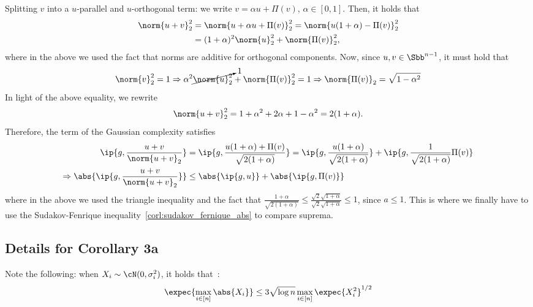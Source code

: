 \documentclass[a4paper]{article}
\begin{document}
Splitting $v$ into a $u$-parallel and $u$-orthogonal term: we write
$v = \alpha u + \Pi(v)$, $\alpha \in [0, 1]$. Then, it holds that
\begin{align*}
    \norm{u + v}_2^2 &= \norm{u + \alpha u + \Pi(v)}_2^2 =
        \norm{u(1 + \alpha) - \Pi(v)}_2^2 \\
        &= (1 + \alpha)^2 \norm{u}_2^2 + \norm{\Pi(v)}^2_2,
\end{align*}
where in the above we used the fact that norms are additive for orthogonal
components. Now, since $u, v \in \Sbb^{n-1}$, it must hold that
\[
    \norm{v}_2^2 = 1 \Rightarrow \alpha^2 \cancelto{1}{\norm{u}_2^2}
    + \norm{\Pi(v)}_2^2 = 1 \Rightarrow
    \norm{\Pi(v)}_2 = \sqrt{1 - \alpha^2}
\]
In light of the above equality, we rewrite
\[
    \norm{u + v}_2^2 = 1 + \alpha^2 + 2\alpha + 1 - \alpha^2 = 2(1 + \alpha).
\]
Therefore, the term of the Gaussian complexity satisfies
\begin{align*}
    \ip{g, \frac{u + v}{\norm{u + v}_2}} &=
    \ip{g, \frac{u(1 + \alpha) + \Pi(v)}{\sqrt{2(1 + \alpha)}}} =
    \ip{g, \frac{u(1 + \alpha)}{\sqrt{2(1 + \alpha)}}}
    + \ip{g, \frac{1}{\sqrt{2(1 + \alpha)}} \Pi(v)} \\ \Rightarrow
    \abs{\ip{g, \frac{u+v}{\norm{u+v}_2}}} &\leq
    \abs{\ip{g, u}} + \abs{\ip{g, \Pi(v)}}
\end{align*}
where in the above we used the triangle inequality and the fact that
$\frac{1+\alpha}{\sqrt{2(1 + \alpha)}} \leq \frac{\sqrt{2}\sqrt{1 + \alpha}}{
\sqrt{2}\sqrt{1 + \alpha}} \leq 1$, since $a \leq 1$.
This is where we finally have to use the Sudakov-Fenrique 
inequality~\cref{corl:sudakov_fernique_abs} to compare suprema.

\subsection*{Details for Corollary 3a}
Note the following: when $X_i \sim \cN(0, \sigma_i^2)$, it holds
that~\cite[Eq. (3.13)]{LedTal13}:
\begin{equation}
    \expec{\max_{i \in [n]} \abs{X_i}} \leq 3 \sqrt{\log n} \max_{i \in [n]}
    \expec{X_i^2}^{1/2}
    \label{eq:expected_sup_gaussian}
\end{equation}
\end{document}
